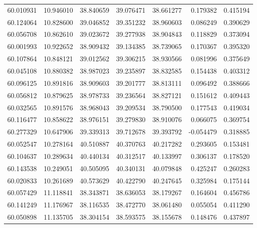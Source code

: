 \begin{tabular}{rrrrrrr}
 60.010931 &  10.946010 &         38.840659 &         39.076471 &         38.661277 &  0.179382 &  0.415194 \\
 60.124064 &  10.828600 &         39.046852 &         39.351232 &         38.960603 &  0.086249 &  0.390629 \\
 60.056708 &  10.862610 &         39.023672 &         39.277938 &         38.904843 &  0.118829 &  0.373094 \\
 60.001993 &  10.922652 &         38.909432 &         39.134385 &         38.739065 &  0.170367 &  0.395320 \\
 60.107864 &  10.848121 &         39.012562 &         39.306215 &         38.930566 &  0.081996 &  0.375649 \\
 60.045108 &  10.880382 &         38.987023 &         39.235897 &         38.832585 &  0.154438 &  0.403312 \\
 60.096125 &  10.891816 &         38.909603 &         39.201777 &         38.813111 &  0.096492 &  0.388666 \\
 60.056812 &  10.879625 &         38.978733 &         39.236564 &         38.827121 &  0.151612 &  0.409443 \\
 60.032565 &  10.891576 &         38.968043 &         39.209534 &         38.790500 &  0.177543 &  0.419034 \\
 60.116477 &  10.858622 &         38.976151 &         39.279830 &         38.910076 &  0.066075 &  0.369754 \\
 60.277329 &  10.647906 &         39.339313 &         39.712678 &         39.393792 & -0.054479 &  0.318885 \\
 60.052547 &  10.278164 &         40.510887 &         40.370763 &         40.217282 &  0.293605 &  0.153481 \\
 60.104637 &  10.289634 &         40.440134 &         40.312517 &         40.133997 &  0.306137 &  0.178520 \\
 60.143538 &  10.249051 &         40.505095 &         40.340131 &         40.079848 &  0.425247 &  0.260283 \\
 60.020833 &  10.261689 &         40.573629 &         40.422790 &         40.247645 &  0.325984 &  0.175144 \\
 60.057429 &  11.118841 &         38.343871 &         38.636053 &         38.179267 &  0.164604 &  0.456786 \\
 60.141249 &  11.176967 &         38.116535 &         38.472770 &         38.061480 &  0.055054 &  0.411290 \\
 60.050898 &  11.135705 &         38.304154 &         38.593575 &         38.155678 &  0.148476 &  0.437897 \\

\end{tabular}
